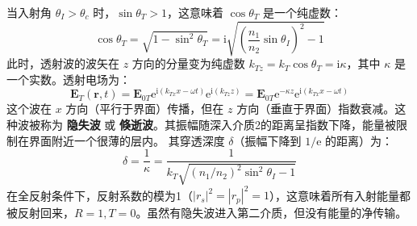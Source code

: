 \documentclass[fontset=none]{ctexart}
\begin{document}
当入射角 $\theta_I > \theta_c$ 时，$\sin\theta_T > 1$，这意味着 $\cos\theta_T$ 是一个纯虚数：
\begin{equation}
\cos\theta_T = \sqrt{1 - \sin^2\theta_T} = \mathrm{i}\sqrt{\left(\frac{n_1}{n_2}\sin\theta_I\right)^2 - 1}
\end{equation}
此时，透射波的波矢在 $z$ 方向的分量变为纯虚数 $k_{Tz} = k_T \cos\theta_T = \mathrm{i} \kappa$，其中 $\kappa$ 是一个实数。透射电场为：
\begin{equation}
\bm{E}_T(\bm{r}, t) = \bm{E}_{0T} \mathrm{e}^{\mathrm{i}(k_{Tx}x - \omega t)} \mathrm{e}^{\mathrm{i}(k_{Tz}z)} = \bm{E}_{0T} \mathrm{e}^{-\kappa z} \mathrm{e}^{\mathrm{i}(k_{Tx}x - \omega t)}
\end{equation}
这个波在 $x$ 方向（平行于界面）传播，但在 $z$ 方向（垂直于界面）指数衰减。这种波被称为 \textbf{隐失波} 或 \textbf{倏逝波}。其振幅随深入介质2的距离呈指数下降，能量被限制在界面附近一个很薄的层内。
其穿透深度 $\delta$（振幅下降到 $1/\mathrm{e}$ 的距离）为：
\begin{equation}
\delta = \frac{1}{\kappa} = \frac{1}{k_T \sqrt{(n_1/n_2)^2\sin^2\theta_I - 1}}
\end{equation}
在全反射条件下，反射系数的模为1（$|r_s|^2=|r_p|^2=1$），这意味着所有入射能量都被反射回来，$R=1, T=0$。虽然有隐失波进入第二介质，但没有能量的净传输。
\end{document}
